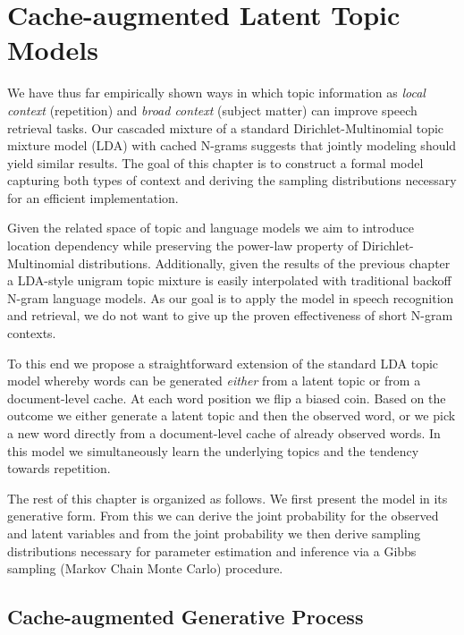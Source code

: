 

\chapter{Cache-augmented Latent Topic Models}
\label{sec:klda}

We have thus far empirically shown ways in which topic information as \textit{local context} (repetition) and \textit{broad context} (subject matter) can improve speech retrieval tasks.  Our cascaded mixture of a standard Dirichlet-Multinomial topic mixture model (LDA) with cached N-grams suggests that jointly modeling should yield similar results.  The goal of this chapter is to construct a formal model capturing both types of context and deriving the sampling distributions necessary for an efficient implementation.

Given the related space of topic and language models we aim to introduce location dependency while preserving the power-law property of Dirichlet-Multinomial distributions.  Additionally, given the results of the previous chapter a LDA-style unigram topic mixture is easily interpolated with traditional backoff N-gram language models.  As our goal is to apply the model in speech recognition and retrieval, we do not want to give up the proven effectiveness of short N-gram contexts.

To this end we propose a straightforward extension of the standard LDA topic model \cite{blei2003latent,steyvers2007} whereby words can be generated \textit{either} from a latent topic or from a document-level cache.  At each word position we flip a biased coin.  Based on the outcome we either generate a latent topic and then the observed word, or we pick a new word directly from a document-level cache of already observed words.  In this model we simultaneously learn the underlying topics and the tendency towards repetition.

The rest of this chapter is organized as follows.  We first present the model in its generative form.  From this we can derive the joint probability for the observed and latent variables and from the joint probability we then derive sampling distributions necessary for parameter estimation and inference via a Gibbs sampling (Markov Chain Monte Carlo) procedure.

\section{Cache-augmented Generative Process}

